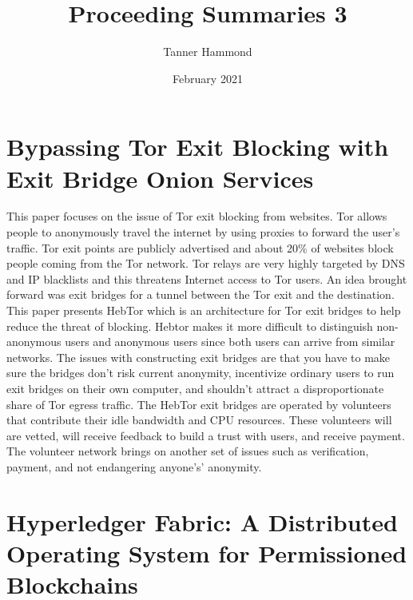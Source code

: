 \documentclass{article}
\title{Proceeding Summaries 3}
\author{Tanner Hammond}
\date{February 2021}
\begin{document}
\maketitle

\section{Bypassing Tor Exit Blocking with Exit Bridge Onion Services \cite{Bypass}}

This paper focuses on the issue of Tor exit blocking from websites. Tor allows people to anonymously travel the internet by using proxies to forward the user's traffic. Tor exit points are publicly advertised and about 20\% of websites block people coming from the Tor network. Tor relays are very highly targeted by DNS and IP blacklists and this threatens Internet access to Tor users. An idea brought forward was exit bridges for a tunnel between the Tor exit and the destination. This paper presents HebTor which is an architecture for Tor exit bridges to help reduce the threat of blocking. Hebtor makes it more difficult to distinguish non-anonymous users and anonymous users since both users can arrive from similar networks. The issues with constructing exit bridges are that you have to make sure the bridges don't risk current anonymity, incentivize ordinary users to run exit bridges on their own computer, and shouldn't attract a disproportionate share of Tor egress traffic. The HebTor exit bridges are operated by volunteers that contribute their idle bandwidth and CPU resources. These volunteers will are vetted, will receive feedback to build a trust with users, and receive payment. The volunteer network brings on another set of issues such as verification, payment, and not endangering anyone's' anonymity.

\section{Hyperledger Fabric: A Distributed Operating System for Permissioned Blockchains \cite{Hyper}}
\end{document}
